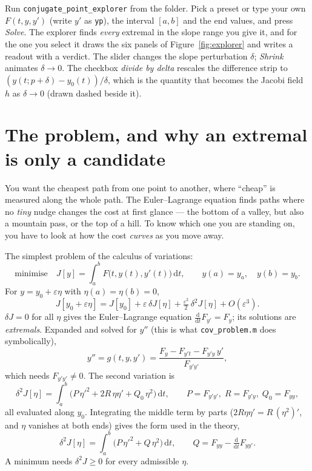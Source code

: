 \documentclass[11pt]{article}
\newcommand{\file}[1]{\texttt{#1}}
\newcommand{\dd}{\mathrm{d}}
\begin{document}
Run \file{conjugate\_point\_explorer} from the folder. Pick a preset or type your
own $F(t, y, y')$ (write $y'$ as \file{yp}), the interval $[a,b]$ and the end
values, and press \emph{Solve}. The explorer finds \emph{every} extremal in the
slope range you give it, and for the one you select it draws the six panels of
Figure~\ref{fig:explorer} and writes a readout with a verdict. The slider changes
the slope perturbation $\delta$; \emph{Shrink} animates $\delta \to 0$. The
checkbox \emph{divide by delta} rescales the difference strip to
$(y(t;p+\delta) - y_0(t))/\delta$, which is the quantity that becomes the Jacobi
field $h$ as $\delta \to 0$ (drawn dashed beside it).

\section{The problem, and why an extremal is only a candidate}

\begin{eli}
You want the cheapest path from one point to another, where ``cheap'' is measured
along the whole path. The Euler--Lagrange equation finds paths where no
\emph{tiny} nudge changes the cost at first glance --- the bottom of a valley,
but also a mountain pass, or the top of a hill. To know which one you are
standing on, you have to look at how the cost \emph{curves} as you move away.
\end{eli}

\begin{rig}
The simplest problem of the calculus of variations:
\[
  \text{minimise}\quad J[y] = \int_a^b F\big(t, y(t), y'(t)\big)\,\dd t,
  \qquad y(a) = y_a,\quad y(b) = y_b .
\]
For $y = y_0 + \varepsilon\eta$ with $\eta(a) = \eta(b) = 0$,
\[
  J[y_0 + \varepsilon\eta] = J[y_0] + \varepsilon\,\delta J[\eta]
     + \tfrac{\varepsilon^2}{2}\,\delta^2 J[\eta] + O(\varepsilon^3).
\]
$\delta J = 0$ for all $\eta$ gives the Euler--Lagrange equation
$\frac{\dd}{\dd t}F_{y'} = F_y$; its solutions are \emph{extremals}. Expanded and
solved for $y''$ (this is what \file{cov\_problem.m} does symbolically),
\[
  y'' = g(t, y, y') = \frac{F_y - F_{y't} - F_{y'y}\,y'}{F_{y'y'}},
\]
which needs $F_{y'y'} \neq 0$. The second variation is
\[
  \delta^2 J[\eta] = \int_a^b \big( P\,\eta'^2 + 2R\,\eta\eta' + Q_0\,\eta^2 \big)\,\dd t,
  \qquad P = F_{y'y'},\; R = F_{y'y},\; Q_0 = F_{yy},
\]
all evaluated along $y_0$. Integrating the middle term by parts
($2R\eta\eta' = R\,(\eta^2)'$, and $\eta$ vanishes at both ends) gives the form
used in the theory,
\[
  \delta^2 J[\eta] = \int_a^b \big( P\,\eta'^2 + Q\,\eta^2 \big)\,\dd t,
  \qquad Q = F_{yy} - \tfrac{\dd}{\dd t}F_{yy'} .
\]
A minimum needs $\delta^2 J \ge 0$ for every admissible $\eta$.
\end{rig}
\end{document}
